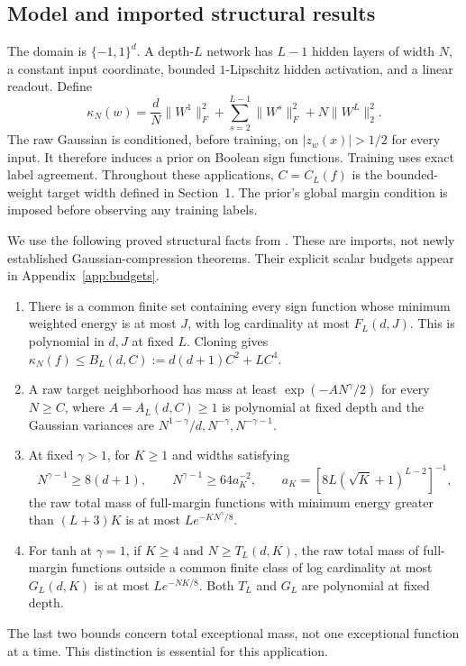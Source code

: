 \documentclass[11pt]{article}
\theoremstyle{remark}\newtheorem{remark}[theorem]{Remark}
\begin{document}
\subsection{Model and imported structural results}

The domain is $\{-1,1\}^d$. A depth-$L$ network has $L-1$ hidden layers
of width $N$, a constant input coordinate, bounded $1$-Lipschitz hidden
activation, and a linear readout. Define
\[
 \kappa_N(w)=\frac dN\|W^1\|_F^2+
 \sum_{s=2}^{L-1}\|W^s\|_F^2+N\|W^L\|_2^2.
\]
The raw Gaussian is conditioned, before training, on
$|z_w(x)|>1/2$ for every input. It therefore induces a prior on Boolean
sign functions. Training uses exact label agreement. Throughout these
applications, $C=C_L(f)$ is the bounded-weight target width defined in
Section~1. The prior's global margin condition is imposed before observing
any training labels.

We use the following proved structural facts from
\cite{strong,above,meanfield}. These are imports, not newly established
Gaussian-compression theorems. Their explicit scalar budgets appear in
Appendix~\ref{app:budgets}.
\begin{enumerate}
\item There is a common finite set containing every sign function whose
minimum weighted energy is at most $J$, with log cardinality at most
$F_L(d,J)$. This is polynomial in $d,J$ at fixed $L$.
Cloning gives $\kappa_N(f)\le B_L(d,C):=d(d+1)C^2+LC^4$.
\item A raw target neighborhood has mass at least
$\exp(-AN^\gamma/2)$ for every $N\ge C$, where
$A=A_L(d,C)\ge1$ is polynomial at fixed depth and the Gaussian variances
are $N^{1-\gamma}/d,N^{-\gamma},N^{-\gamma-1}$.
\item At fixed $\gamma>1$, for $K\ge1$ and widths satisfying
\[
 N^{\gamma-1}\ge8(d+1),\qquad
 N^{\gamma-1}\ge64a_K^{-2},\qquad
 a_K=[8L(\sqrt K+1)^{L-2}]^{-1},
\]
the raw total mass of full-margin functions with minimum energy greater
than $(L+3)K$ is at most $L e^{-KN^\gamma/8}$.
\item For tanh at $\gamma=1$, if $K\ge4$ and $N\ge T_L(d,K)$,
the raw total mass of full-margin functions outside a common finite class
of log cardinality at most $G_L(d,K)$ is at most $L e^{-NK/8}$.
Both $T_L$ and $G_L$ are polynomial at fixed depth.
\end{enumerate}
The last two bounds concern total exceptional mass, not one exceptional
function at a time. This distinction is essential for this application.
\end{document}
